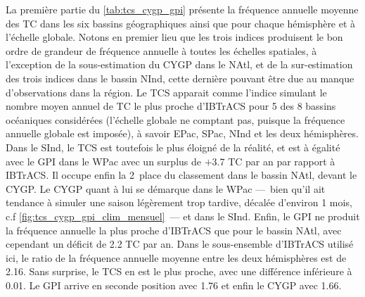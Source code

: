 \documentclass[../main.tex]{subfiles}
\begin{document}
La première partie du \cref{tab:tcs_cygp_gpi} présente la fréquence annuelle moyenne des TC dans les six bassins géographiques ainsi que pour chaque hémisphère
et à l'échelle globale. Notons en premier lieu que les trois indices produisent le bon ordre de grandeur de fréquence annuelle à toutes les échelles spatiales,
à l'exception de la sous-estimation du CYGP dans le NAtl, et de la sur-estimation des trois indices dans le bassin NInd, cette dernière pouvant être due au
manque d'observations dans la région. Le TCS apparait comme l'indice simulant le nombre moyen annuel de TC le plus proche d'IBTrACS pour \num{5} des \num{8}
bassins océaniques considérées (l'échelle globale ne comptant pas, puisque la fréquence annuelle globale est imposée), à savoir EPac, SPac, NInd et les deux
hémisphères. Dans le SInd, le TCS est toutefois le plus éloigné de la réalité, et est à égalité avec le GPI dans le WPac avec un surplus de $+$\num{3.7} TC par
an par rapport à IBTrACS. Il occupe enfin la 2\ieme~place du classement dans le bassin NAtl, devant le CYGP. Le CYGP quant à lui se démarque dans le WPac
---~bien qu'il ait tendance à simuler une saison légèrement trop tardive, décalée d'environ 1 mois, c.f \cref{fig:tcs_cygp_gpi_clim_mensuel}~--- et dans le
SInd. Enfin, le GPI ne produit la fréquence annuelle la plus proche d'IBTrACS que pour le bassin NAtl, avec cependant un déficit de \num{2.2} TC par an. Dans le
sous-ensemble d'IBTrACS utilisé ici, le ratio de la fréquence annuelle moyenne entre les deux hémisphères est de \num{2.16}. Sans surprise, le TCS en est le
plus proche, avec une différence inférieure à \num{0.01}. Le GPI arrive en seconde position avec \num{1.76} et enfin le CYGP avec \num{1.66}.
\end{document}
